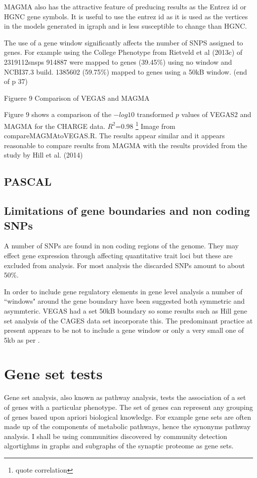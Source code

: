 MAGMA also has the attractive feature of preducing results as the Entrez id or HGNC gene symbols. It is useful to use the entrez id as it is used as the vertices in the models generated in igraph and is less susceptible to change than HGNC.

The use of a gene window significantly affects the number of SNPS assigned to genes. For example using the College Phenotype from Rietveld et al (2013c) of 2319112snsps 914887 were mapped to genes (39.45\%) using no window and NCBI37.3 build. 1385602 (59.75\%) mapped to genes using a 50kB window. (end of p 37)
 
Figuere 9 Comparison of VEGAS and MAGMA

Figure 9 shows a comparison of the $-log10$ transformed $p$ values of VEGAS2 and MAGMA for the CHARGE data. $R^2$=0.98 \footnote{quote correlation} Image from compareMAGMAtoVEGAS.R. The results appear similar and it appears reasonable to compare results from MAGMA with the results provided from the study by Hill et al. (2014)
\subsection{PASCAL}

\subsection{Limitations of gene boundaries and non coding SNPs}
A number of SNPs are found in non coding regions of the genome. They may effect gene expression through affecting quantitative trait loci but these are excluded from analysis. For most analysis the discarded SNPs amount to about 50\%.

In order to include gene regulatory elements in gene level analysis a number of ``windows" around the gene boundary have been suggested both symmetric and asymmteric. VEGAS had a set 50kB boundary so some results such as Hill \cite{hill2014human} gene set analysis of the CAGES data set incorporate this. The predominant practice at present appears to be not to include a gene window or only a very small one of 5kb as per \cite{savage2018genome}.


\section{ Gene set tests}

Gene set analysis, also known as pathway analysis, tests the association of a set of genes with a particular phenotype. The set of genes can represent any grouping of genes based upon apriori biological knowledge. For example gene sets are often made up of the components of metabolic pathways, hence the synonyms pathway analysis. I shall be using communities discovered by community detection algortighms in graphs and subgraphs of the synaptic proteome as gene sets.

